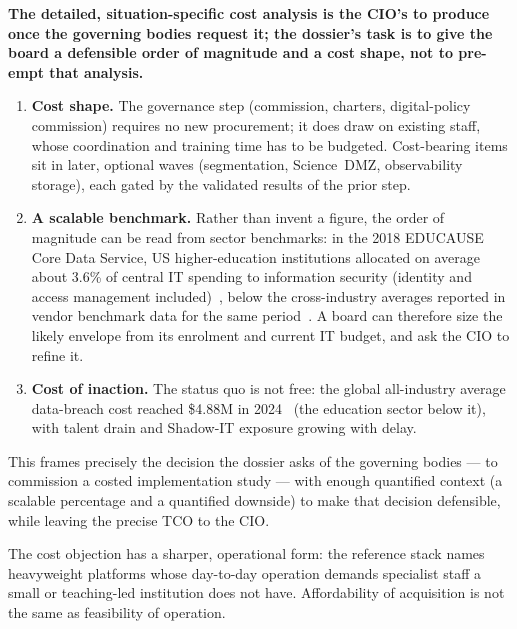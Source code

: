 \begin{answerbox}[Answer to Q9.3]
\textbf{The detailed, situation-specific cost analysis is the CIO's to produce once the governing bodies request it; the dossier's task is to give the board a defensible order of magnitude and a cost shape, not to pre-empt that analysis.}
\begin{enumerate}[nosep]
  \item \textbf{Cost shape.} The governance step (commission, charters, digital-policy commission) requires no new procurement; it does draw on existing staff, whose coordination and training time has to be budgeted. Cost-bearing items sit in later, optional waves (segmentation, Science~DMZ, observability storage), each gated by the validated results of the prior step.
  \item \textbf{A scalable benchmark.} Rather than invent a figure, the order of magnitude can be read from sector benchmarks: in the 2018 EDUCAUSE Core Data Service, US higher-education institutions allocated on average about 3.6\% of central IT spending to information security (identity and access management included)~\cite{educause-infosec-almanac-2019}, below the cross-industry averages reported in vendor benchmark data for the same period~\cite{gartner-security-spend2024}. A board can therefore size the likely envelope from its enrolment and current IT budget, and ask the CIO to refine it.
  \item \textbf{Cost of inaction.} The status quo is not free: the global all-industry average data-breach cost reached \$4.88M in 2024~\cite{ibm-cost-breach-2024} (the education sector below it), with talent drain and Shadow-IT exposure growing with delay.
\end{enumerate}
\noindent This frames precisely the decision the dossier asks of the governing bodies --- to commission a costed implementation study --- with enough quantified context (a scalable percentage and a quantified downside) to make that decision defensible, while leaving the precise TCO to the CIO.
\end{answerbox}

\bigskip

\begin{questionbox}
The cost objection has a sharper, operational form: the reference stack names heavyweight platforms whose day-to-day operation demands specialist staff a small or teaching-led institution does not have. Affordability of acquisition is not the same as feasibility of operation.
\end{questionbox}

